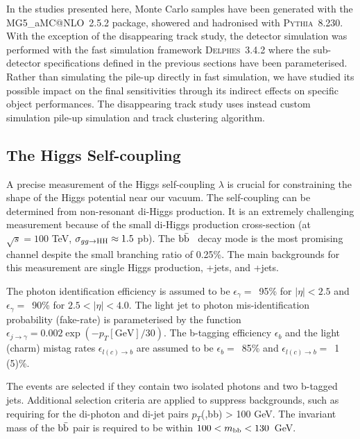\documentclass[11pt,twoside,a4paper]{cernrep}
\newcommand*{\effg}{\ensuremath{\epsilon_{\gamma}}}
\newcommand*{\misg}{\ensuremath{\epsilon_{j \rightarrow \gamma}}}
\newcommand*{\effb}{\ensuremath{\epsilon_{b}}}
\newcommand*{\mislc}{\ensuremath{\epsilon_{l(c) \rightarrow b}}}
\begin{document}
In the studies presented here, Monte Carlo samples have been generated with the {\scshape MG5\_}a{\scshape MC@NLO}~2.5.2 package, showered and hadronised with {\scshape Pythia}~8.230. With the exception of the disappearing track study, the detector simulation was performed with the fast simulation framework {\scshape Delphes}~3.4.2 where the sub-detector specifications defined in the previous sections have been parameterised. Rather than simulating the pile-up directly in fast simulation, we have studied its possible impact on the final sensitivities through its indirect effects on specific object performances. The disappearing track study uses instead custom simulation  pile-up simulation and track clustering algorithm.

\subsection{The Higgs Self-coupling}

A precise measurement of the Higgs self-coupling $\lambda$ is crucial for constraining the shape of the Higgs potential near our vacuum. The self-coupling can be determined from non-resonant di-Higgs production. It is an extremely challenging measurement because of the small di-Higgs production cross-section (at $\sqrt{s} {=}100$ TeV, $\sigma_{gg\to {\rm HH}} \approx 1.5$ pb). The $\rm b\bar{b}$\textgamma\textgamma~ decay mode is the most promising channel despite the small branching ratio of 0.25\%. The main backgrounds for this measurement are single Higgs production, \textgamma\textgamma+jets, and \textgamma+jets.

The photon identification efficiency is assumed to be $\effg=$~95\% for $|\eta| < 2.5$ and $\effg=$~90\% for $2.5 < |\eta| < 4.0$. The light jet to photon mis-identification probability (fake-rate) is parameterised by the function $\misg = 0.002 \exp(-p_T[\mathrm{GeV}]/30)$. The b-tagging efficiency $\effb$ and the light (charm) mistag rates $\mislc$ are assumed to be $\effb=$~85\% and $\mislc=$~1 (5)\%.

The events are selected if they contain two isolated photons and two b-tagged jets. Additional selection criteria are applied to suppress backgrounds, such as requiring for the di-photon and di-jet pairs $p_T$(\textgamma\textgamma,bb) > 100 GeV. The invariant mass of the $\rm b\bar{b}$ pair is required to be within \linebreak \mbox{$100 <m_{\rm bb} < 130$ GeV}.
\end{document}
